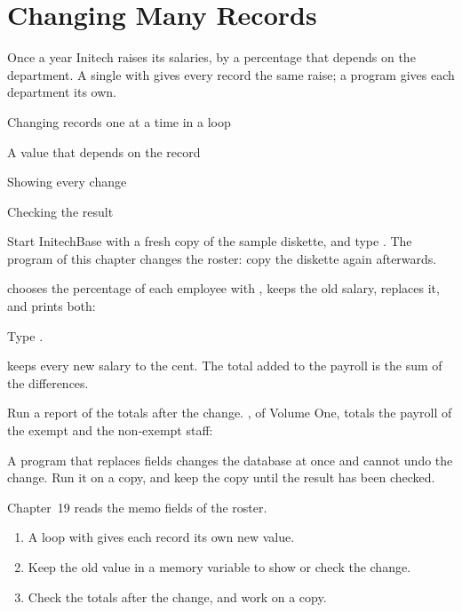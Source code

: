 \chapter{Changing Many Records}
Once a year Initech raises its salaries, by a percentage that depends on the
department.  A single  with  gives every record the same
raise; a program gives each department its own.

\begin{ChapterCovers}
\item Changing records one at a time in a loop
\item A value that depends on the record
\item Showing every change
\item Checking the result
\end{ChapterCovers}

Start InitechBase with a fresh copy of the sample diskette, and type
.  The program of this chapter changes the roster: copy the
diskette again afterwards.

 chooses the percentage of each employee with ,
keeps the old salary, replaces it, and prints both:
\begin{Steps}
\item Type .
\end{Steps}
 keeps every new salary to the cent.  The total added to the
payroll is the sum of the differences.

Run a report of the totals after the change.  , of Volume
One, totals the payroll of the exempt and the non-exempt staff:
\begin{AteWarning}
A program that replaces fields changes the database at once and cannot undo the
change.  Run it on a copy, and keep the copy until the result has been checked.
\end{AteWarning}

Chapter~19 reads the memo fields of the roster.

\begin{enumerate}
\item A loop with  gives each record its own new value.
\item Keep the old value in a memory variable to show or check the change.
\item Check the totals after the change, and work on a copy.
\end{enumerate}
